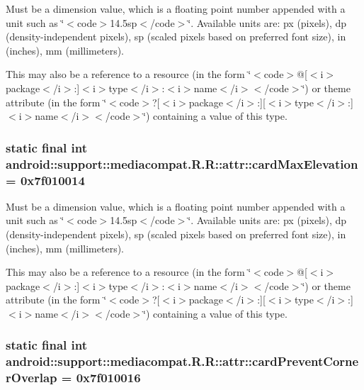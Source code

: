 Must be a dimension value, which is a floating point number appended with a unit such as \char`\"{}$<$code$>$14.5sp$<$/code$>$\char`\"{}. Available units are: px (pixels), dp (density-independent pixels), sp (scaled pixels based on preferred font size), in (inches), mm (millimeters). 

This may also be a reference to a resource (in the form \char`\"{}$<$code$>$@\mbox{[}$<$i$>$package$<$/i$>$:\mbox{]}$<$i$>$type$<$/i$>$:$<$i$>$name$<$/i$>$$<$/code$>$\char`\"{}) or theme attribute (in the form \char`\"{}$<$code$>$?\mbox{[}$<$i$>$package$<$/i$>$:\mbox{]}\mbox{[}$<$i$>$type$<$/i$>$:\mbox{]}$<$i$>$name$<$/i$>$$<$/code$>$\char`\"{}) containing a value of this type. \hypertarget{classandroid_1_1support_1_1mediacompat_1_1_r_1_1attr_21bb1dd1d020943c3e4013e06331af86}{
\subsubsection[{cardMaxElevation}]{\setlength{\rightskip}{0pt plus 5cm}static final int android::support::mediacompat.R.R::attr::cardMaxElevation = 0x7f010014}}
\label{classandroid_1_1support_1_1mediacompat_1_1_r_1_1attr_21bb1dd1d020943c3e4013e06331af86}


Must be a dimension value, which is a floating point number appended with a unit such as \char`\"{}$<$code$>$14.5sp$<$/code$>$\char`\"{}. Available units are: px (pixels), dp (density-independent pixels), sp (scaled pixels based on preferred font size), in (inches), mm (millimeters). 

This may also be a reference to a resource (in the form \char`\"{}$<$code$>$@\mbox{[}$<$i$>$package$<$/i$>$:\mbox{]}$<$i$>$type$<$/i$>$:$<$i$>$name$<$/i$>$$<$/code$>$\char`\"{}) or theme attribute (in the form \char`\"{}$<$code$>$?\mbox{[}$<$i$>$package$<$/i$>$:\mbox{]}\mbox{[}$<$i$>$type$<$/i$>$:\mbox{]}$<$i$>$name$<$/i$>$$<$/code$>$\char`\"{}) containing a value of this type. \hypertarget{classandroid_1_1support_1_1mediacompat_1_1_r_1_1attr_9b552d4088a3e007d3538b1f5bdb79f3}{
\subsubsection[{cardPreventCornerOverlap}]{\setlength{\rightskip}{0pt plus 5cm}static final int android::support::mediacompat.R.R::attr::cardPreventCornerOverlap = 0x7f010016}}
\label{classandroid_1_1support_1_1mediacompat_1_1_r_1_1attr_9b552d4088a3e007d3538b1f5bdb79f3}


